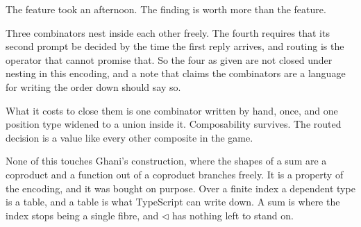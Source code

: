 \documentclass[11pt,a4paper]{article}
\begin{document}
\begin{sectionbox}
The feature took an afternoon. The finding is worth more than the feature.

Three combinators nest inside each other freely. The fourth requires that its second prompt be
decided by the time the first reply arrives, and routing is the operator that cannot promise
that. So the four as given are not closed under nesting in this encoding, and a note that claims
the combinators are a language for writing the order down should say so.

What it costs to close them is one combinator written by hand, once, and one position type
widened to a union inside it. Composability survives. The routed decision is a value like every
other composite in the game.

None of this touches Ghani's construction, where the shapes of a sum are a coproduct and a
function out of a coproduct branches freely. It is a property of the encoding, and it was
bought on purpose. Over a finite index a dependent type is a table, and a table is what
TypeScript can write down. A sum is where the index stops being a single fibre, and $\lhd$ has
nothing left to stand on.
\end{sectionbox}
\end{document}
